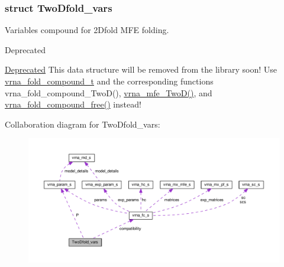 \subsubsection{struct Two\-Dfold\-\_\-vars}
Variables compound for 2\-Dfold M\-F\-E folding. 

\begin{DoxyRefDesc}{Deprecated}
\item[\hyperlink{deprecated__deprecated000001}{Deprecated}]This data structure will be removed from the library soon! Use \hyperlink{group__fold__compound_ga1b0cef17fd40466cef5968eaeeff6166}{vrna\-\_\-fold\-\_\-compound\-\_\-t} and the corresponding functions vrna\-\_\-fold\-\_\-compound\-\_\-\-Two\-D(), \hyperlink{group__kl__neighborhood__mfe_ga243c288b463147352829df04de6a2f77}{vrna\-\_\-mfe\-\_\-\-Two\-D()}, and \hyperlink{group__fold__compound_gadded6039d63f5d6509836e20321534ad}{vrna\-\_\-fold\-\_\-compound\-\_\-free()} instead! \end{DoxyRefDesc}


Collaboration diagram for Two\-Dfold\-\_\-vars\-:
\nopagebreak
\begin{figure}[H]
\begin{center}
\leavevmode
\includegraphics[width=350pt]{structTwoDfold__vars__coll__graph}
\end{center}
\end{figure}
